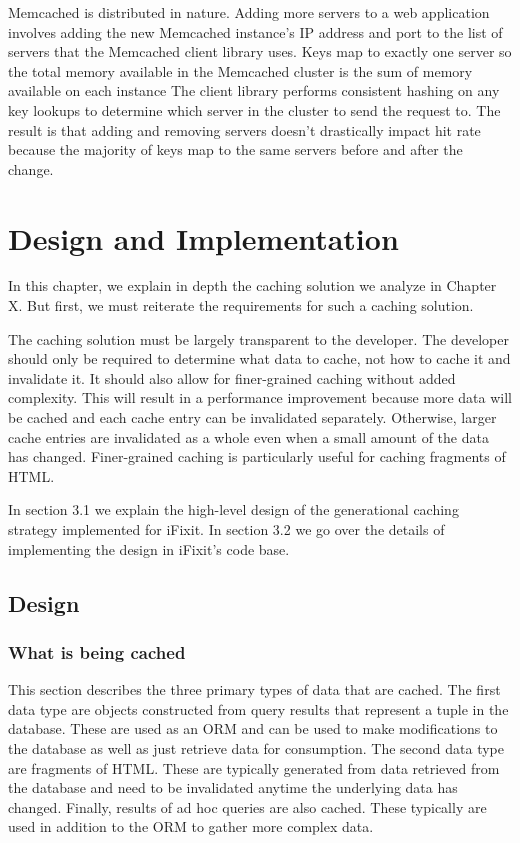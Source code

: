 \documentclass[12pt]{ucthesis}
\begin{document}
{\textsf Memcached} is distributed in nature.
Adding more servers to a web application involves adding the new {\textsf Memcached} instance's IP address and port to the list of servers that the {\textsf Memcached} client library uses.
Keys map to exactly one server so the total memory available in the {\textsf Memcached} cluster is the sum of memory available on each instance
The client library performs consistent hashing on any key lookups to determine which server in the cluster to send the request to.
The result is that adding and removing servers doesn't drastically impact hit rate because the majority of keys map to the same servers before and after the change.


\chapter{Design and Implementation}
\label{designAndImplementation}
In this chapter, we explain in depth the caching solution we analyze in Chapter X.
But first, we must reiterate the requirements for such a caching solution.

The caching solution must be largely transparent to the developer.
The developer should only be required to determine what data to cache, not how to cache it and invalidate it.
It should also allow for finer-grained caching without added complexity.
This will result in a performance improvement because more data will be cached and each cache entry can be invalidated separately.
Otherwise, larger cache entries are invalidated as a whole even when a small amount of the data has changed.
Finer-grained caching is particularly useful for caching fragments of HTML.

In section 3.1 we explain the high-level design of the generational caching strategy implemented for iFixit.
In section 3.2 we go over the details of implementing the design in iFixit's code base.

\section{Design}
\subsection{What is being cached}
This section describes the three primary types of data that are cached.
The first data type are objects constructed from query results that represent a tuple in the database.
These are used as an ORM and can be used to make modifications to the database as well as just retrieve data for consumption.
The second data type are fragments of HTML.
These are typically generated from data retrieved from the database and need to be invalidated anytime the underlying data has changed.
Finally, results of ad hoc queries are also cached.
These typically are used in addition to the ORM to gather more complex data.
\end{document}

